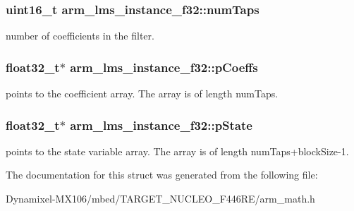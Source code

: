\subsubsection[{\texorpdfstring{num\+Taps}{numTaps}}]{\setlength{\rightskip}{0pt plus 5cm}uint16\+\_\+t arm\+\_\+lms\+\_\+instance\+\_\+f32\+::num\+Taps}\hypertarget{structarm__lms__instance__f32_af73880d9009982f5d14529869494ec3d}{}\label{structarm__lms__instance__f32_af73880d9009982f5d14529869494ec3d}
number of coefficients in the filter. 
\subsubsection[{\texorpdfstring{p\+Coeffs}{pCoeffs}}]{\setlength{\rightskip}{0pt plus 5cm}float32\+\_\+t$\ast$ arm\+\_\+lms\+\_\+instance\+\_\+f32\+::p\+Coeffs}\hypertarget{structarm__lms__instance__f32_a4795c6f7d3f17cec15c2fd09f66edd1a}{}\label{structarm__lms__instance__f32_a4795c6f7d3f17cec15c2fd09f66edd1a}
points to the coefficient array. The array is of length num\+Taps. 
\subsubsection[{\texorpdfstring{p\+State}{pState}}]{\setlength{\rightskip}{0pt plus 5cm}float32\+\_\+t$\ast$ arm\+\_\+lms\+\_\+instance\+\_\+f32\+::p\+State}\hypertarget{structarm__lms__instance__f32_aaf94285be2f99b5b9af40bea8dcb14b9}{}\label{structarm__lms__instance__f32_aaf94285be2f99b5b9af40bea8dcb14b9}
points to the state variable array. The array is of length num\+Taps+block\+Size-\/1. 

The documentation for this struct was generated from the following file\+:\begin{DoxyCompactItemize}
\item 
Dynamixel-\/\+M\+X106/mbed/\+T\+A\+R\+G\+E\+T\+\_\+\+N\+U\+C\+L\+E\+O\+\_\+\+F446\+R\+E/arm\+\_\+math.\+h\end{DoxyCompactItemize}
